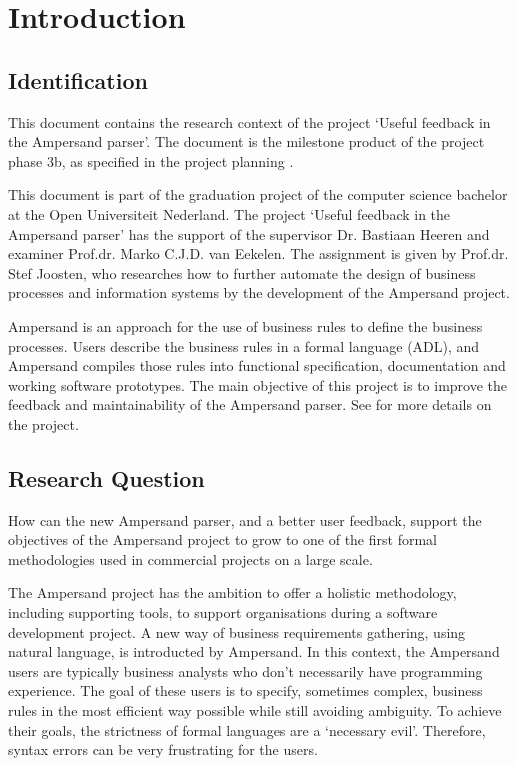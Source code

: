 
\section{Introduction}
\subsection{Identification}
This document contains the research context of the project `Useful feedback in the Ampersand parser'.
The document is the milestone product of the project phase 3b, as specified in the project planning .

This document is part of the graduation project of the computer science bachelor at the Open Universiteit Nederland.
The project `Useful feedback in the Ampersand parser' has the support of the supervisor Dr. Bastiaan Heeren and examiner Prof.dr. Marko C.J.D. van Eekelen.
The assignment is given by Prof.dr. Stef Joosten, who researches how to further automate the design of business processes and information systems by the development of the Ampersand project.

Ampersand is an approach for the use of business rules to define the business processes.
Users describe the business rules in a formal language (ADL), and Ampersand compiles those rules into functional specification, documentation and working software
prototypes.
The main objective of this project is to improve the feedback and maintainability of the Ampersand parser.
See  for more details on the project.

\subsection{Research Question}
How can the new Ampersand parser, and a better user feedback, support the objectives of the Ampersand project to grow to one of the first formal methodologies used in commercial projects on a large scale.

The Ampersand project has the ambition to offer a holistic methodology, including supporting tools, to support organisations during a software development project.
A new way of business requirements gathering, using natural language, is introducted by Ampersand.
In this context, the Ampersand users are typically business analysts who don't necessarily have programming experience.
The goal of these users is to specify, sometimes complex, business rules in the most efficient way possible while still avoiding ambiguity. To achieve their goals, the strictness of formal languages are a `necessary evil'. Therefore, syntax errors can be very frustrating for the users.

